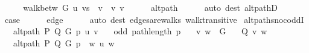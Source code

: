 \begin{isabellebody}
\ {}\isanewline
\ \ \isamarkupfalse%
\ {\isachardoublequoteopen}walk{\isacharunderscore}{\kern0pt}betw\ G\ u\ {\isacharparenleft}{\kern0pt}vs\ {\isacharat}{\kern0pt}\ {\isacharbrackleft}{\kern0pt}v{\isacharprime}{\kern0pt}{\isacharprime}{\kern0pt}{\isacharbrackright}{\kern0pt}\ {\isacharat}{\kern0pt}\ {\isacharbrackleft}{\kern0pt}v{\isacharprime}{\kern0pt}{\isacharbrackright}{\kern0pt}{\isacharparenright}{\kern0pt}\ v{\isacharprime}{\kern0pt}{\isachardoublequoteclose}\isanewline
\ \ \ \ \isamarkupfalse%
\ alt{\isacharunderscore}{\kern0pt}path\isanewline
\ \ \ \ \isamarkupfalse%
\ {\isacharparenleft}{\kern0pt}auto\ dest{\isacharcolon}{\kern0pt}\ alt{\isacharunderscore}{\kern0pt}pathD{\isacharparenleft}{\kern0pt}{}{\isacharparenright}{\kern0pt}{\isacharparenright}{\kern0pt}\isanewline
\ \ \isamarkupfalse%
\ {\isacharquery}{\kern0pt}case\isanewline
\ \ \ \ \isamarkupfalse%
\ edge\isanewline
\ \ \ \ \isamarkupfalse%
\ {\isacharparenleft}{\kern0pt}auto\ dest{\isacharcolon}{\kern0pt}\ edges{\isacharunderscore}{\kern0pt}are{\isacharunderscore}{\kern0pt}walks\ walk{\isacharunderscore}{\kern0pt}transitive{\isacharparenright}{\kern0pt}\isanewline
{}\isamarkupfalse%
%
\endisatagproof
{\isafoldproof}%
%
\isadelimproof
\isanewline
%
\endisadelimproof
%
\isadeliminvisible
\isanewline
%
\endisadeliminvisible
%
\isataginvisible
{}\isamarkupfalse%
\ alt{\isacharunderscore}{\kern0pt}path{\isacharunderscore}{\kern0pt}snoc{\isacharunderscore}{\kern0pt}oddI{\isacharcolon}{\kern0pt}\isanewline
\ \ \ {\isachardoublequoteopen}alt{\isacharunderscore}{\kern0pt}path\ P\ Q\ G\ p\ u\ v{\isachardoublequoteclose}\isanewline
\ \ \ {\isachardoublequoteopen}odd\ {\isacharparenleft}{\kern0pt}path{\isacharunderscore}{\kern0pt}length\ p{\isacharparenright}{\kern0pt}{\isachardoublequoteclose}\isanewline
\ \ \ {\isachardoublequoteopen}{\isacharbraceleft}{\kern0pt}v{\isacharcomma}{\kern0pt}\ w{\isacharbraceright}{\kern0pt}\ {\isasymin}\ G{\isachardoublequoteclose}\isanewline
\ \ \ {\isachardoublequoteopen}Q\ {\isacharbraceleft}{\kern0pt}v{\isacharcomma}{\kern0pt}\ w{\isacharbraceright}{\kern0pt}{\isachardoublequoteclose}\isanewline
\ \ \ {\isachardoublequoteopen}alt{\isacharunderscore}{\kern0pt}path\ P\ Q\ G\ {\isacharparenleft}{\kern0pt}p\ {\isacharat}{\kern0pt}\ {\isacharbrackleft}{\kern0pt}w{\isacharbrackright}{\kern0pt}{\isacharparenright}{\kern0pt}\ u\ w{\isachardoublequoteclose}%

\end{isabellebody}
